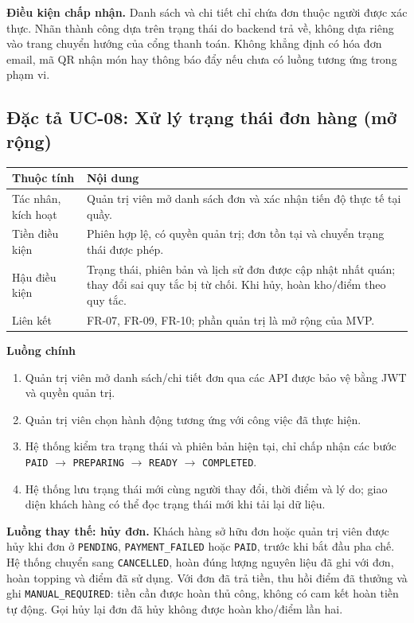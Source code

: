 \textbf{Điều kiện chấp nhận.} Danh sách và chi tiết chỉ chứa đơn thuộc
người được xác thực. Nhãn thành công dựa trên trạng thái do backend trả
về, không dựa riêng vào trang chuyển hướng của cổng thanh toán. Không
khẳng định có hóa đơn email, mã QR nhận món hay thông báo đẩy nếu chưa
có luồng tương ứng trong phạm vi.

\subsection{Đặc tả UC-08: Xử lý trạng thái đơn hàng (mở rộng)}
\label{uc:08}
\label{uc08}

\begin{longtable}{|p{3.1cm}|p{11.5cm}|}
\hline \textbf{Thuộc tính} & \textbf{Nội dung} \\ \hline
Tác nhân, kích hoạt & Quản trị viên mở danh sách đơn và xác nhận tiến độ
thực tế tại quầy. \\ \hline
Tiền điều kiện & Phiên hợp lệ, có quyền quản trị; đơn tồn tại và chuyển
trạng thái được phép. \\ \hline
Hậu điều kiện & Trạng thái, phiên bản và lịch sử đơn được cập nhật nhất
quán; thay đổi sai quy tắc bị từ chối. Khi hủy, hoàn kho/điểm theo quy tắc. \\ \hline
Liên kết & FR-07, FR-09, FR-10; phần quản trị là mở rộng của MVP. \\ \hline
\end{longtable}

\textbf{Luồng chính}
\begin{enumerate}[nosep]
  \item Quản trị viên mở danh sách/chi tiết đơn qua các API
   được bảo vệ bằng JWT và quyền quản trị.
  \item Quản trị viên chọn hành động tương ứng với công việc đã thực hiện.
  \item Hệ thống kiểm tra trạng thái và phiên bản hiện tại, chỉ chấp nhận
  các bước \texttt{PAID} $\rightarrow$ \texttt{PREPARING}
  $\rightarrow$ \texttt{READY} $\rightarrow$ \texttt{COMPLETED}.
  \item Hệ thống lưu trạng thái mới cùng người thay đổi, thời điểm và lý
  do; giao diện khách hàng có thể đọc trạng thái mới khi tải lại dữ liệu.
\end{enumerate}

\textbf{Luồng thay thế: hủy đơn.} Khách hàng sở hữu đơn hoặc quản trị
viên được hủy khi đơn ở \texttt{PENDING}, \texttt{PAYMENT\_FAILED} hoặc
\texttt{PAID}, trước khi bắt đầu pha chế. Hệ thống chuyển sang
\texttt{CANCELLED}, hoàn đúng lượng nguyên liệu đã ghi với đơn, hoàn
topping và điểm đã sử dụng. Với đơn đã trả tiền, thu hồi điểm đã thưởng
và ghi \texttt{MANUAL\_REQUIRED}: tiền cần được hoàn thủ công, không có
cam kết hoàn tiền tự động. Gọi hủy lại đơn đã hủy không được hoàn kho/điểm lần hai.

